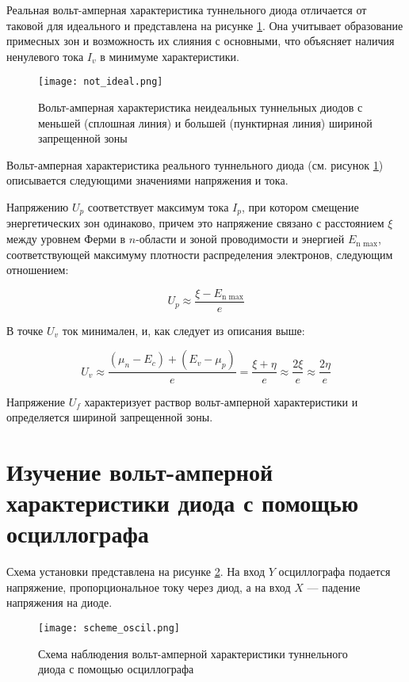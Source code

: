 \documentclass[a4paper,12pt]{article}
\begin{document}
Реальная вольт-амперная характеристика туннельного диода отличается от таковой для идеального и представлена на рисунке \ref{pic:not_ideal}. Она учитывает образование примесных зон и возможность их слияния с основными, что объясняет наличия ненулевого тока $I_v$ в минимуме характеристики. 
	
\begin{figure}[h]
    \centering	
    \texttt{[image: not\_ideal.png]}
    \caption{Вольт-амперная характеристика неидеальных туннельных диодов с меньшей (сплошная линия) и большей (пунктирная линия) шириной запрещенной зоны}
    \label{pic:not_ideal}
\end{figure}  
	
Вольт-амперная характеристика реального туннельного диода (см. рисунок \ref{pic:not_ideal}) описывается следующими значениями напряжения и тока. 
	
Напряжению $U_p$ соответствует максимум тока $I_p$, при котором смещение энергетических зон одинаково, причем это напряжение связано с расстоянием $\xi$ между уровнем Ферми в $n$-области и зоной проводимости и энергией $E_\text{n max}$, соответствующей максимуму плотности распределения электронов, следующим отношением: 
	
\[ U_p \approx \frac{\xi - E_\text{n max}}{e} \]
	
В точке $U_v$ ток минимален, и, как следует из описания выше:
	
\[ U_v \approx \frac{(\mu_n - E_c) + (E_v - \mu_p)}{e} = \frac{\xi + \eta}{e} \approx \frac{2\xi}{e} \approx \frac{2\eta}{e} \]
	
Напряжение $U_f$ характеризует раствор вольт-амперной характеристики и определяется шириной запрещенной зоны. 

\section{Изучение вольт-амперной характеристики диода с помощью осциллографа}
	
Схема установки представлена на рисунке \ref{pic:scheme_oscil}. На вход $ Y $ осциллографа подается напряжение, пропорциональное току через диод, а на вход $ X $ --- падение напряжения на диоде.
	
\begin{figure}[h]
    \centering	
    \texttt{[image: scheme\_oscil.png]}
    \caption{Схема наблюдения вольт-амперной характеристики туннельного диода с помощью осциллографа}
    \label{pic:scheme_oscil}
\end{figure}
	
\end{document}
